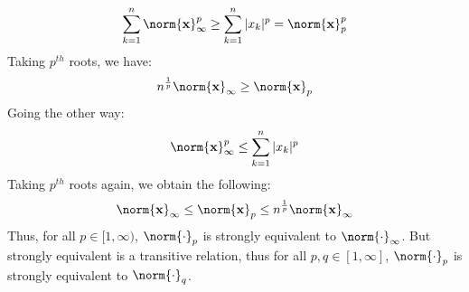 \documentclass[crop=false,class=article,oneside]{standalone}
\begin{document}
\begin{solution}[1]
\begin{equation}
                \sum_{k=1}^{n}\norm{\mathbf{x}}_{\infty}^{p}
                \geq\sum_{k=1}^{n}|x_{k}|^{p}
                =\norm{\mathbf{x}}_{p}^{p}
            \end{equation}
            Taking $p^{th}$ roots, we have:
            \begin{equation}
                n^{\frac{1}{p}}\norm{\mathbf{x}}_{\infty}
                \geq\norm{\mathbf{x}}_{p}
            \end{equation}
            Going the other way:
            \begin{equation}
                \norm{\mathbf{x}}_{\infty}^{p}\leq
                \sum_{k=1}^{n}|x_{k}|^{p}
            \end{equation}
            Taking $p^{th}$ roots again, we obtain the following:
            \begin{equation}
                \norm{\mathbf{x}}_{\infty}\leq\norm{\mathbf{x}}_{p}
                \leq{n}^{\frac{1}{p}}\norm{\mathbf{x}}_{\infty}
            \end{equation}
            Thus, for all $p\in[1,\infty)$, $\norm{\cdot}_{p}$
            is strongly equivalent to $\norm{\cdot}_{\infty}$.
            But strongly equivalent is a transitive relation,
            thus for all $p,q\in[1,\infty]$, $\norm{\cdot}_{p}$
            is strongly equivalent to $\norm{\cdot}_{q}$.
        \end{solution}
\end{document}
